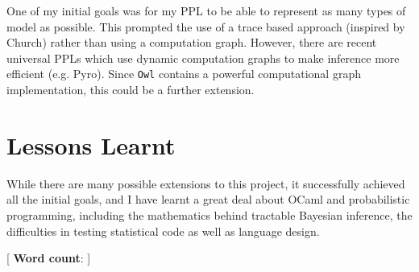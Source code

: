 One of my initial goals was for my PPL to be able to represent as many types of model as possible. This prompted the use of a trace based approach (inspired by Church) rather than using a computation graph. However, there are recent universal PPLs which use dynamic computation graphs to make inference more efficient (e.g. Pyro). Since \texttt{Owl} contains a powerful computational graph implementation, this could be a further extension.
\vspace{-3mm}

\section{Lessons Learnt}
While there are many possible extensions to this project, it successfully achieved all the initial goals, and I have learnt a great deal about OCaml and probabilistic programming, including the mathematics behind tractable Bayesian inference, the difficulties in testing statistical code as well as language design.

[ {\small \textbf{Word count}: }]

